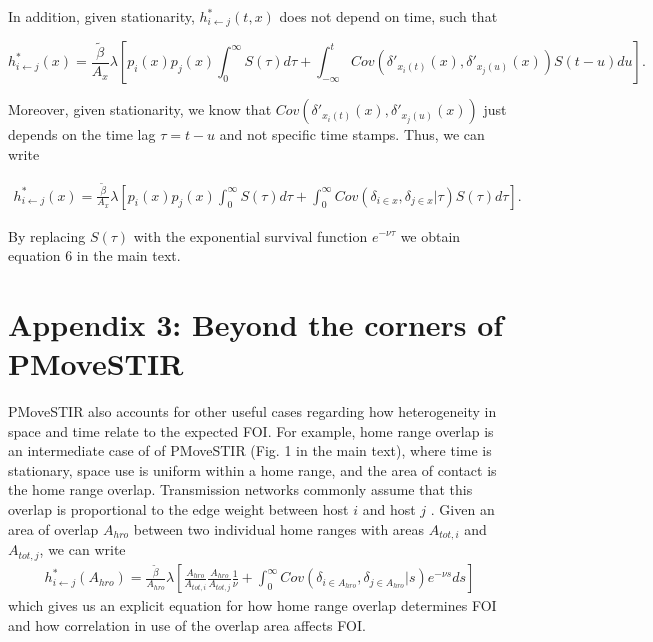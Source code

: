 \documentclass[letterpaper]{article}
\begin{document}
In addition, given stationarity, $h^*_{i \leftarrow j}(t, x)$ does not depend on time, such that 

$$
h^*_{i \leftarrow j}(x) = \frac{\tilde{\beta}}{A_x} \lambda \left[p_i(x) p_j(x) \int_0^\infty S(\tau) d\tau  + \int_{-\infty}^t Cov(\delta'_{x_i(t)}(x), \delta'_{x_j(u)}(x)) S(t - u) du\right].
$$

Moreover, given stationarity, we know that $Cov(\delta'_{x_i(t)}(x), \delta'_{x_j(u)}(x))$ just depends on the time lag $\tau = t - u$ and not specific time stamps. Thus, we can write

\begin{equation}
    \begin{aligned}
   h^*_{i \leftarrow j}(x) = \frac{\tilde{\beta}}{A_x} \lambda \left[p_i(x)p_j(x) \int_0^\infty S(\tau) d\tau + \int_{0}^{\infty} Cov(\delta_{i \in x}, \delta_{j \in x} | \tau) S(\tau) d\tau\right].
    \end{aligned}
    \label{eq:foi_stationary}
\end{equation}

By replacing $S(\tau)$ with the exponential survival function $e^{-\nu \tau}$ we obtain equation 6 in the main text.

\section*{Appendix 3: Beyond the corners of PMoveSTIR}

PMoveSTIR also accounts for other useful cases regarding how heterogeneity in space and time relate to the expected FOI. For example, home range overlap is an intermediate case of of PMoveSTIR (Fig. 1 in the main text), where time is stationary, space use is uniform within a home range, and the area of contact is the home range overlap.  
Transmission networks commonly assume that this overlap is proportional to the edge weight between host $i$ and host $j$ \citep[e.g.][]{Springer2017a}. 
Given an area of overlap $A_{hro}$ between two individual home ranges with areas $A_{tot, i}$ and $A_{tot, j}$, we can write
\begin{equation}
    \begin{aligned}
    h^*_{i \leftarrow j}(A_{hro}) = \frac{\tilde{\beta}}{A_{hro}} \lambda \left[\frac{A_{hro}}{A_{tot, i}} \frac{A_{hro}}{A_{tot, j}}  \frac{1}{\nu} + \int_{0}^{\infty} Cov(\delta_{i \in A_{hro}}, \delta_{j \in A_{hro}} | s) e^{-\nu s} ds\right]
    \end{aligned}
    \label{eq:home_range}
\end{equation}
which gives us an explicit equation for how home range overlap determines FOI and how correlation in use of the overlap area affects FOI. 
\end{document}
